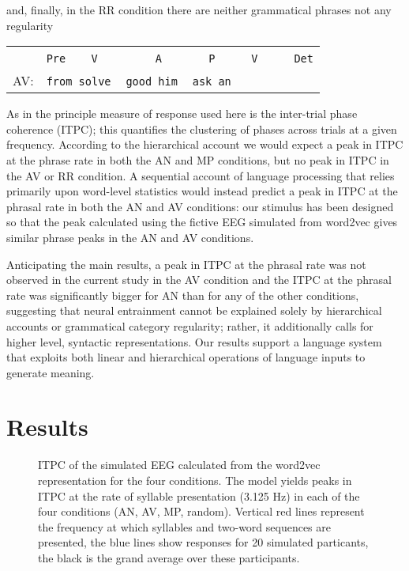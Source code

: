 \documentclass[10pt,letterpaper]{article}
\newcommand{\tts}{%
  \texttt{\,}
}
\begin{document}
and, finally, in the RR condition there are neither grammatical phrases not any regularity
\begin{center}
  \begin{tabular}{cl}
   &\texttt{Pre}\tts{}\tts{}\texttt{V}\tts\tts\tts{}\tts{}\tts{}\texttt{A}\tts{}\tts\tts{}\tts{}\texttt{P}\tts{}\tts{}\tts{}\texttt{V}\tts\tts\tts{}\texttt{Det}\\ 
AV:&\texttt{from solve}\tts\texttt{good him}{}\tts\texttt{ask an}
\end{tabular}
\end{center}

As in \cite{DingEtAl2017} the principle measure of response used here
is the inter-trial phase coherence (ITPC); this quantifies the
clustering of phases across trials at a given frequency. According to
the hierarchical account we would expect a peak in ITPC at the phrase
rate in both the AN and MP conditions, but no peak in ITPC in the AV
or RR condition. A sequential account of language processing that
relies primarily upon word-level statistics would instead predict a
peak in ITPC at the phrasal rate in both the AN and AV conditions: our
stimulus has been designed so that the peak calculated using the
fictive EEG simulated from word2vec gives similar phrase peaks in the
AN and AV conditions.

Anticipating the main results, a peak in ITPC at the phrasal rate was
not observed in the current study in the AV condition and the ITPC at
the phrasal rate was significantly bigger for AN than for any of the
other conditions, suggesting that neural entrainment cannot be
explained solely by hierarchical accounts or grammatical category
regularity; rather, it additionally calls for higher level, syntactic
representations. Our results support a language system that exploits
both linear and hierarchical operations of language inputs to generate
meaning.


\section*{Results}

\begin{figure}[tbhp]

\caption{ITPC of the simulated EEG calculated from the word2vec
  representation for the four conditions. The model yields peaks in
  ITPC at the rate of syllable presentation (3.125 Hz) in each of the
  four conditions (AN, AV, MP, random). Vertical red lines represent
  the frequency at which syllables and two-word sequences are
  presented, the blue lines show responses for 20 simulated
  particants, the black is the grand average over these participants.
}
\label{fig:Fig1}
\end{figure}
\end{document}
